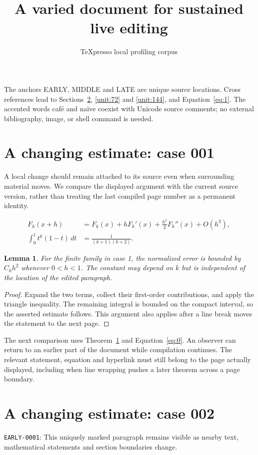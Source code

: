 \documentclass[a4paper,10pt]{article}
\title{A varied document for sustained live editing}
\author{TeXpresso local profiling corpus}
\date{}
\newtheorem{lemma}[theorem]{Lemma}
\begin{document}
\maketitle
The anchors EARLY, MIDDLE and LATE are unique source locations. Cross references
lead to Sections~\ref{unit:1}, \ref{unit:72} and \ref{unit:144},
and Equation~\ref{eq:1}. The accented words caf\'{e} and na\"ive coexist with
Unicode source comments; no external bibliography, image, or shell command is needed.

\section{A changing estimate: case 001}\label{unit:0}
A local change should remain attached to its source even when surrounding material moves. We compare the displayed argument with the current source version, rather than treating the last compiled page number as a permanent identity.

\lipsum[1-2]
\begin{align}\label{eq:0}
 F_k(x+h)&=F_k(x)+hF_k'(x)+\frac{h^2}{2}F_k''(x)+O(h^3),\\
 \int_0^1 t^k(1-t)\,dt&=\frac{1}{(k+1)(k+2)}.
\end{align}
\begin{lemma}\label{thm:0}
For the finite family in case 1, the normalized error is bounded by $C_k h^2$ whenever $0<h<1$. The constant may depend on $k$ but is independent of the location of the edited paragraph.
\end{lemma}
\begin{proof}
Expand the two terms, collect their first-order contributions, and apply the
triangle inequality. The remaining integral is bounded on the compact interval,
so the asserted estimate follows. This argument also applies after a line break
moves the statement to the next page.
\end{proof}
The next comparison uses Theorem~\ref{thm:0} and Equation~\ref{eq:0}. An observer can return to an earlier part of the document while compilation continues. The relevant statement, equation and hyperlink must still belong to the page actually displayed, including when line wrapping pushes a later theorem across a page boundary.

\lipsum[3]

\section{A changing estimate: case 002}\label{unit:1}
\hypertarget{varied:early}{}\label{anchor:early}
\noindent \texttt{EARLY-0001}: This uniquely marked paragraph remains visible as nearby text, mathematical statements and section boundaries change.
\end{document}
